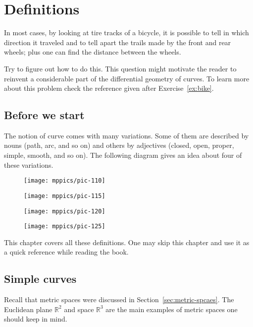 \chapter{Definitions}
\label{chap:curves-def}

In most cases, by looking at tire tracks of a bicycle,
it is possible to tell in which direction it traveled and to tell apart the trails made by the front and rear wheels;
plus one can find the distance between the wheels.

Try to figure out how to do this.
This question might motivate the reader to reinvent a considerable part of the differential geometry of curves.
To learn more about this problem check the reference given after Exercise~\ref{ex:bike}.

\section{Before we start}

The notion of curve comes with many variations.
Some of them are described by nouns (path, arc, and so on) and  
others by adjectives (closed, open, proper, simple, smooth, and so on).
The following diagram gives an idea about four of these variations.

\vskip-0mm
\begin{figure}[h!]
\begin{minipage}{.48\textwidth}
\centering
\texttt{[image: mppics/pic-110]}
\end{minipage}\hfill
\begin{minipage}{.48\textwidth}
\centering
\texttt{[image: mppics/pic-115]}
\end{minipage}
\bigskip
\begin{minipage}{.48\textwidth}
\centering
\texttt{[image: mppics/pic-120]}
\end{minipage}\hfill
\begin{minipage}{.48\textwidth}
\centering
\texttt{[image: mppics/pic-125]}
\end{minipage}
\end{figure}
\vskip-0mm

This chapter covers all these definitions.
One may skip this chapter and use it as a quick reference while reading the book.

\section{Simple curves}

Recall that metric spaces were discussed in Section~\ref{sec:metric-spcaes}.
The Euclidean plane $\mathbb{R}^2$ and space $\mathbb{R}^3$ are the main examples of metric spaces one should keep in mind.


